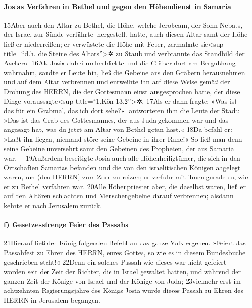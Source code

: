 \hypertarget{josias-verfahren-in-bethel-und-gegen-den-huxf6hendienst-in-samaria}{%
\paragraph{Josias Verfahren in Bethel und gegen den Höhendienst in
Samaria}\label{josias-verfahren-in-bethel-und-gegen-den-huxf6hendienst-in-samaria}}

15Aber auch den Altar zu Bethel, die Höhe, welche Jerobeam, der Sohn
Nebats, der Israel zur Sünde verführte, hergestellt hatte, auch diesen
Altar samt der Höhe ließ er niederreißen; er verwüstete die Höhe mit
Feuer, zermalmte sie\textless sup title=``d.h. die Steine des
Altars''\textgreater✲ zu Staub und verbrannte das Standbild der Aschera.
16Als Josia dabei umherblickte und die Gräber dort am Bergabhang
wahrnahm, sandte er Leute hin, ließ die Gebeine aus den Gräbern
herausnehmen und auf dem Altar verbrennen und entweihte ihn auf diese
Weise gemäß der Drohung des HERRN, die der Gottesmann einst
ausgesprochen hatte, der diese Dinge voraussagte\textless sup
title=``1.Kön 13,2''\textgreater✲. 17Als er dann fragte: »Was ist das
für ein Grabmal, das ich dort sehe?«, antworteten ihm die Leute der
Stadt: »Das ist das Grab des Gottesmannes, der aus Juda gekommen war und
das angesagt hat, was du jetzt am Altar von Bethel getan hast.« 18Da
befahl er: »Laßt ihn liegen, niemand störe seine Gebeine in ihrer Ruhe!«
So ließ man denn seine Gebeine unversehrt samt den Gebeinen des
Propheten, der aus Samaria war.~-- 19Außerdem beseitigte Josia auch alle
Höhenheiligtümer, die sich in den Ortschaften Samarias befanden und die
von den israelitischen Königen angelegt waren, um (den HERRN) zum Zorn
zu reizen; er verfuhr mit ihnen gerade so, wie er zu Bethel verfahren
war. 20Alle Höhenpriester aber, die daselbst waren, ließ er auf den
Altären schlachten und Menschengebeine darauf verbrennen; alsdann kehrte
er nach Jerusalem zurück.

\hypertarget{f-gesetzesstrenge-feier-des-passahs}{%
\paragraph{f) Gesetzesstrenge Feier des
Passahs}\label{f-gesetzesstrenge-feier-des-passahs}}

21Hierauf ließ der König folgenden Befehl an das ganze Volk ergehen:
»Feiert das Passahfest zu Ehren des HERRN, eures Gottes, so wie es in
diesem Bundesbuche geschrieben steht!« 22Denn ein solches Passah wie
dieses war nicht gefeiert worden seit der Zeit der Richter, die in
Israel gewaltet hatten, und während der ganzen Zeit der Könige von
Israel und der Könige von Juda; 23vielmehr erst im achtzehnten
Regierungsjahre des Königs Josia wurde dieses Passah zu Ehren des HERRN
in Jerusalem begangen.

